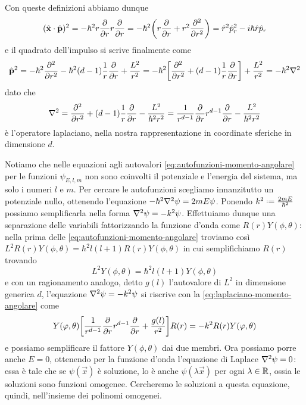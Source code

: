 Con queste definizioni abbiamo dunque
\begin{equation}
	({\hat{\mathbf{x}}}\cdot{\hat{\mathbf{p}}})^2=-\hbar^2r\frac{\partial {}}{\partial {r}}r\frac{\partial {}}{\partial {r}}=-\hbar^2\bigg(r\frac{\partial {}}{\partial {r}}+r^2\frac{\partial^2 {}}{\partial {r}^2}\bigg)=\hat{r}^2\hat{p}_r^2-i\hbar \hat{r}\hat{p}_r
\end{equation}
e il quadrato dell'impulso si scrive finalmente come
\begin{equation}
	\hat{\mathbf{p}}^2=-\hbar^2\frac{\partial^2 {}}{\partial {r}^2}-\hbar^2(d-1)\frac1{r}\frac{\partial {}}{\partial {r}}+\frac{L^2}{r^2}=
	-\hbar^2\bigg[\frac{\partial^2 {}}{\partial {r}^2}+(d-1)\frac1{r}\frac{\partial {}}{\partial {r}}\bigg]+\frac{L^2}{r^2}=
	-\hbar^2\nabla^2
\end{equation}
dato che
\begin{equation}
	\nabla^2=\frac{\partial^2 {}}{\partial {r}^2}+(d-1)\frac1{r}\frac{\partial {}}{\partial {r}}-\frac{L^2}{\hbar^2r^2}=
	\frac1{r^{d-1}}\frac{\partial {}}{\partial {r}}r^{d-1}\frac{\partial {}}{\partial {r}}-\frac{L^2}{\hbar^2r^2}
	\label{eq:laplaciano-momento-angolare}
\end{equation}
è l'operatore laplaciano, nella nostra rappresentazione in coordinate sferiche in dimensione $d$.

Notiamo che nelle equazioni agli autovalori \eqref{eq:autofunzioni-momento-angolare} per le funzioni $\psi_{E,l,m}$ non sono coinvolti il potenziale e l'energia del sistema, ma solo i numeri $l$ e $m$.
Per cercare le autofunzioni scegliamo innanzitutto un potenziale nullo, ottenendo l'equazione $-\hbar^2\nabla^2\psi=2mE\psi$.
Ponendo $k^2\defeq\frac{2mE}{\hbar^2}$ possiamo semplificarla nella forma $\nabla^2\psi=-k^2\psi$.
Effettuiamo dunque una separazione delle variabili fattorizzando la funzione d'onda come $R(r)Y(\phi,\theta)$: nella prima delle \eqref{eq:autofunzioni-momento-angolare} troviamo cos\`i $L^2R(r)Y(\phi,\theta)=\hbar^2l(l+1)R(r)Y(\phi,\theta)$ in cui semplifichiamo $R(r)$ trovando
\begin{equation}
	L^2Y(\phi,\theta)=\hbar^2l(l+1)Y(\phi,\theta)
\end{equation}
e con un ragionamento analogo, detto $g(l)$ l'autovalore di $L^2$ in dimensione generica $d$, l'equazione $\nabla^2\psi=-k^2\psi$ si riscrive con la \eqref{eq:laplaciano-momento-angolare} come
\begin{equation}
	Y(\varphi,\theta)\bigg[\frac1{r^{d-1}}\frac{\partial {}}{\partial {r}}r^{d-1}\frac{\partial {}}{\partial {r}}+\frac{g(l)}{r^2}\bigg]R(r)=-k^2R(r)Y(\varphi,\theta)
	\label{eq:laplace-parte-radiale}
\end{equation}
e possiamo semplificare il fattore $Y(\phi,\theta)$ dai due membri.
Ora possiamo porre anche $E=0$, ottenendo per la funzione d'onda l'equazione di Laplace $\nabla^2\psi=0$: essa è tale che se $\psi(\vec x)$ è soluzione, lo è anche $\psi(\lambda\vec x)$ per ogni $\lambda\in\mathbb{R}$, ossia le soluzioni sono funzioni omogenee.
Cercheremo le soluzioni a questa equazione, quindi, nell'insieme dei polinomi omogenei.

